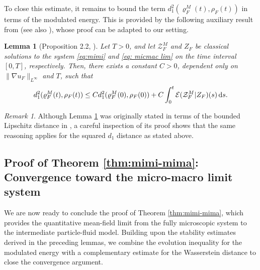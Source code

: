 \documentclass[10pt, reqno]{amsart}
\newtheorem{lemma}[theorem]{Lemma}
\theoremstyle{definition}
\theoremstyle{remark}
\newtheorem{remark}[theorem]{Remark}
\numberwithin{equation}{section}
\newcommand{\ds}{\textnormal{d}s}
\newcommand{\calE}{\mathcal E}
\newcommand{\calZ}{\mathcal Z}
\begin{document}
To close this estimate, it remains to bound the term $d_{1}^2(\varrho_F^M(t),\rho_F(t))$ in terms of the modulated energy. This is provided by the following auxiliary result from \cite{CC21} (see also \cite[Proposition 3.1]{Ch21}), whose proof can be adapted to our setting.
\begin{lemma}[Proposition 2.2, \cite{CC21}] \label{lem: d1 sigma} Let $T>0$, and let $\calZ_F^M$ and $ Z_F$ be classical solutions to the system \eqref{eq:mimi} and \eqref{eq: micmac lim} on the time interval $[0,T]$, respectively. Then, there exists a constant $C>0$, dependent only on $\|\nabla u_F\|_{L^\infty}$ and $T$, such that
    \begin{align*}
        d_{1}^2(\varrho_F^M(t),\rho_F(t)) \le C d_{1}^2(\varrho_F^M(0),\rho_F(0)) + C\int_0^t \calE(\calZ_F^M| Z_F)(s) \, \ds. 
    \end{align*}
\end{lemma}
 
 


\begin{remark}
    Although Lemma \ref{lem: d1 sigma} was originally stated in terms of the bounded Lipschitz distance in \cite{CC21}, a careful inspection of its proof shows that the same reasoning applies for the squared $d_1$ distance as stated above.
\end{remark}

%
%
%
%
%
%
\subsection{Proof of Theorem \ref{thm:mimi-mima}: Convergence toward the micro-macro limit system}\label{sec:23}
We are now ready to conclude the proof of Theorem \ref{thm:mimi-mima}, which provides the quantitative mean-field limit from the fully microscopic system to the intermediate particle-fluid model. Building upon the stability estimates derived in the preceding lemmas, we combine the evolution inequality for the modulated energy with a complementary estimate for the Wasserstein distance to close the convergence argument.
\end{document}
